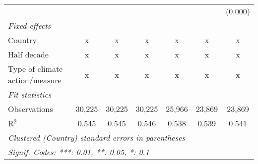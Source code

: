 \begin{tabular}{lcccccc}
                                                                     &         &         &              &              &              & (0.000)\\   
   \emph{Fixed effects}\\
   Country                                                           & x       & x       & x            & x            & x            & x\\  
   Half decade                                                       & x       & x       & x            & x            & x            & x\\  
   Type of climate action/measure                                    & x       & x       & x            & x            & x            & x\\  
   \midrule \emph{Fit statistics}\\
   Observations                                                      & 30,225  & 30,225  & 30,225       & 25,966       & 23,869       & 23,869\\  
   R$^2$                                                             & 0.545   & 0.545   & 0.546        & 0.538        & 0.539        & 0.541\\  
   \midrule
   \multicolumn{7}{l}{\emph{Clustered (Country) standard-errors in parentheses}}\\
   \multicolumn{7}{l}{\emph{Signif. Codes: ***: 0.01, **: 0.05, *: 0.1}}\\
\end{tabular}
\par\endgroup


